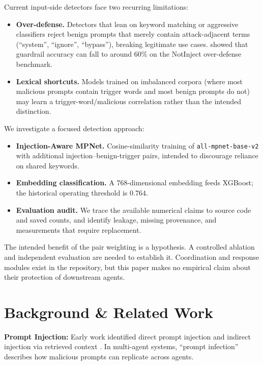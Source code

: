 \documentclass[11pt, a4paper]{article}
\begin{document}
Current input-side detectors face two recurring limitations:

\begin{itemize}
    \item \textbf{Over-defense.} Detectors that lean on keyword matching or
          aggressive classifiers reject benign prompts that merely contain
          attack-adjacent terms (``system'', ``ignore'', ``bypass''),
          breaking legitimate use cases. \citet{li2024injecguard} showed
          that guardrail accuracy can fall to around 60\%
          on the NotInject over-defense benchmark.
    \item \textbf{Lexical shortcuts.} Models trained on imbalanced corpora
          (where most malicious prompts contain trigger words and most
          benign prompts do not) may learn a trigger-word/malicious
          correlation rather than the intended distinction.
\end{itemize}

We investigate a focused detection approach:
\begin{itemize}
    \item \textbf{Injection-Aware MPNet.} Cosine-similarity training of
          \texttt{all-mpnet-base-v2} with additional injection--benign-trigger
          pairs, intended to discourage reliance on shared keywords.
    \item \textbf{Embedding classification.} A 768-dimensional embedding
          feeds XGBoost; the historical operating threshold is $0.764$.
    \item \textbf{Evaluation audit.} We trace the available numerical
          claims to source code and saved counts, and identify leakage,
          missing provenance, and measurements that require replacement.
\end{itemize}
The intended benefit of the pair weighting is a hypothesis. A controlled
ablation and independent evaluation are needed to establish it. Coordination
and response modules exist in the repository, but this paper makes no
empirical claim about their protection of downstream agents.

\section{Background \& Related Work}

\textbf{Prompt Injection:} Early work identified direct prompt injection \citep{perez2022ignore} and indirect injection via retrieved context \citep{greshake2023more}. In multi-agent systems, ``prompt infection'' \citep{lee2024prompt} describes how malicious prompts can replicate across agents.
\end{document}
